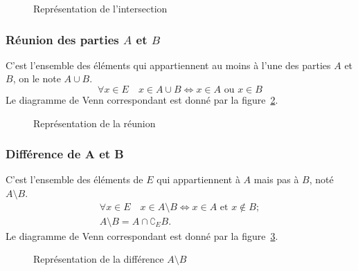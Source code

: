\begin{figure}
\centering
{}
\caption{Représentation de l'intersection}
\label{chap3-fig:inter}
\end{figure}

\subsubsection{Réunion des parties \(A\) et \(B\)}
\label{chap3-subsubsec:reunion}
C'est l'ensemble des éléments qui appartiennent au moins à l'une des parties \(A\) et \(B\), on le note \(A \cup B\).
\begin{equation}
  \forall x \in E \quad x \in A \cup B \iff x \in A \text{~ou~} x \in B
\end{equation}
Le diagramme de Venn correspondant est donné par la figure~\ref{chap3-fig:reunion}.

\begin{figure}
\centering
{}
\caption{Représentation de la réunion}
\label{chap3-fig:reunion}
\end{figure}

\subsubsection{Différence de A et B}
\label{chap3-subsubsec:difference}
C'est l'ensemble des éléments de \(E\) qui appartiennent à \(A\) mais pas à \(B\), noté \(A \setminus B\).
\begin{gather}
  \forall x \in E \quad x \in A \setminus B \iff x \in A \text{~et~} x \not\in B; \\
  A \setminus B=A \cap \complement_E B.
\end{gather}
Le diagramme de Venn correspondant est donné par la figure~\ref{chap3-fig:diff}.

\begin{figure}
\centering
{}
\caption{Représentation de la différence \(A \setminus B\)}
\label{chap3-fig:diff}
\end{figure}


